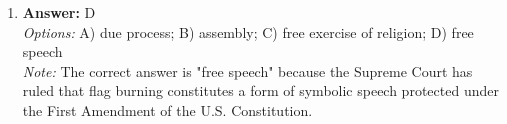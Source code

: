 \documentclass[12pt]{article}
\begin{document}
\begin{enumerate}[label=\arabic*.]
\\ \textit{Options:} A) A new democratic internationalism led by the United States; B) A new balance of power between the US and China; C) A new global economic framework; D) A new era of globalization
\\ \textit{Note:} The term 'New World Order' refers to the post-Cold War vision of global politics characterized by increased cooperation and democratic ideals, predominantly championed by the United States as it sought to promote democracy and liberal values internationally.
\item \textbf{Answer:} D
\\ \textit{Options:} A) due process; B) assembly; C) free exercise of religion; D) free speech
\\ \textit{Note:} The correct answer is "free speech" because the Supreme Court has ruled that flag burning constitutes a form of symbolic speech protected under the First Amendment of the U.S. Constitution.
\end{enumerate}
\end{document}
